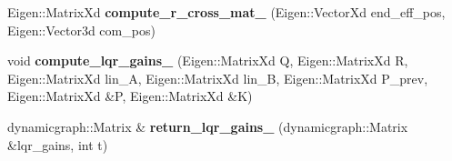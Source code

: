\begin{DoxyCompactItemize}
\item 
Eigen\+::\+Matrix\+Xd {\bfseries compute\+\_\+r\+\_\+cross\+\_\+mat\+\_\+} (Eigen\+::\+Vector\+Xd end\+\_\+eff\+\_\+pos, Eigen\+::\+Vector3d com\+\_\+pos)\hypertarget{classdynamicgraph_1_1sot_1_1ReactiveLQRController_ad916eab348bd474acd0f6878930afccc}{}\label{classdynamicgraph_1_1sot_1_1ReactiveLQRController_ad916eab348bd474acd0f6878930afccc}

\item 
void {\bfseries compute\+\_\+lqr\+\_\+gains\+\_\+} (Eigen\+::\+Matrix\+Xd Q, Eigen\+::\+Matrix\+Xd R, Eigen\+::\+Matrix\+Xd lin\+\_\+A, Eigen\+::\+Matrix\+Xd lin\+\_\+B, Eigen\+::\+Matrix\+Xd P\+\_\+prev, Eigen\+::\+Matrix\+Xd \&P, Eigen\+::\+Matrix\+Xd \&K)\hypertarget{classdynamicgraph_1_1sot_1_1ReactiveLQRController_a83a4b8fe1fa38fcef3e4a8050b4c38dc}{}\label{classdynamicgraph_1_1sot_1_1ReactiveLQRController_a83a4b8fe1fa38fcef3e4a8050b4c38dc}

\item 
dynamicgraph\+::\+Matrix \& {\bfseries return\+\_\+lqr\+\_\+gains\+\_\+} (dynamicgraph\+::\+Matrix \&lqr\+\_\+gains, int t)\hypertarget{classdynamicgraph_1_1sot_1_1ReactiveLQRController_a69da0343d71b0f3a6b2695b9233158cb}{}\label{classdynamicgraph_1_1sot_1_1ReactiveLQRController_a69da0343d71b0f3a6b2695b9233158cb}

\end{DoxyCompactItemize}
